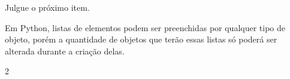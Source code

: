 

{%

\item \rtask \ponto{\pt} %
Julgue o próximo item.

Em Python, listas de elementos podem ser preenchidas por qualquer tipo de objeto, porém a quantidade de objetos que terão essas listas só poderá ser alterada durante a criação delas.

{\setlength{\columnsep}{0pt}\renewcommand{\columnseprule}{0pt}
\begin{multicols}{2}
\begin{answerlist}[label={\texttt{\Alph*}.},leftmargin=*]
    \ti[V.]
    \ifnum{}\doneitem[F.]\else\ti[F.]\fi %
\end{answerlist}
\end{multicols}
}

}


